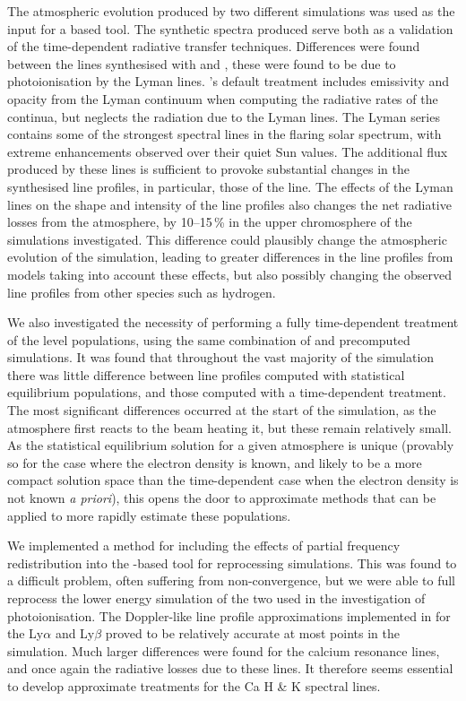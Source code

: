 The atmospheric evolution produced by two different \Radyn{} simulations was used as the input for a \Lw{} based tool.
The synthetic spectra produced serve both as a validation of the time-dependent radiative transfer techniques.
Differences were found between the \Caii{} lines synthesised with \Radyn{} and \Lw{}, these were found to be due to photoionisation by the Lyman lines.
\Radyn{}'s default treatment includes emissivity and opacity from the Lyman continuum when computing the radiative rates of the \Caii{} continua, but neglects the radiation due to the Lyman lines.
The Lyman series contains some of the strongest spectral lines in the flaring solar spectrum, with extreme enhancements observed over their quiet Sun values.
The additional flux produced by these lines is sufficient to provoke substantial changes in the synthesised \Caii{} line profiles, in particular, those of the \CaLine{} line.
The effects of the Lyman lines on the shape and intensity of the \Caii{} line profiles also changes the net radiative losses from the atmosphere, by 10--15\,\% in the upper chromosphere of the simulations investigated.
This difference could plausibly change the atmospheric evolution of the simulation, leading to greater differences in the \Caii{} line profiles from models taking into account these effects, but also possibly changing the observed line profiles from other species such as hydrogen.

We also investigated the necessity of performing a fully time-dependent treatment of the \Caii{} level populations, using the same combination of \Lw{} and precomputed \Radyn{} simulations.
It was found that throughout the vast majority of the simulation there was little difference between line profiles computed with statistical equilibrium populations, and those computed with a time-dependent treatment.
The most significant differences occurred at the start of the simulation, as the atmosphere first reacts to the beam heating it, but these remain relatively small.
As the statistical equilibrium solution for a given atmosphere is unique (provably so for the case where the electron density is known, and likely to be a more compact solution space than the time-dependent case when the electron density is not known \emph{a priori}), this opens the door to approximate methods that can be applied to more rapidly estimate these populations.

We implemented a method for including the effects of partial frequency redistribution into the \Lw{}-based tool for reprocessing \Radyn{} simulations.
This was found to a difficult problem, often suffering from non-convergence, but we were able to full reprocess the lower energy simulation of the two used in the investigation of \Caii{} photoionisation.
The Doppler-like line profile approximations implemented in \Radyn{} for the Ly$\alpha$ and Ly$\beta$ proved to be relatively accurate at most points in the simulation.
Much larger differences were found for the calcium resonance lines, and once again the radiative losses due to these lines.
It therefore seems essential to develop approximate treatments for the Ca H \& K spectral lines.

